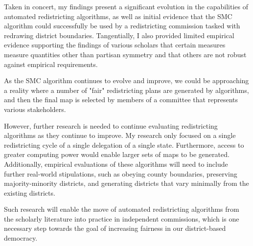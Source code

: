 Taken in concert, my findings present a significant evolution in the capabilities of automated redistricting algorithms, as well as initial evidence that the SMC algorithm could successfully be used by a redistricting commission tasked with redrawing district boundaries. Tangentially, I also provided limited empirical evidence supporting the findings of various scholars that certain measures measure quantities other than partisan symmetry and that others are not robust against empirical requirements. 

As the SMC algorithm continues to evolve and improve, we could be approaching a reality where a number of "fair" redistricting plans are generated by algorithms, and then the final map is selected by members of a committee that represents various stakeholders.

However, further research is needed to continue evaluating redistricting algorithms as they continue to improve. My research only focused on a single redistricting cycle of a single delegation of a single state. Furthermore, access to greater computing power would enable larger sets of maps to be generated. Additionally, empirical evaluations of these algorithms will need to include further real-world stipulations, such as obeying county boundaries, preserving majority-minority districts, and generating districts that vary minimally from the existing districts. 

Such research will enable the move of automated redistricting algorithms from the scholarly literature into practice in independent commissions, which is one necessary step towards the goal of increasing fairness in our district-based democracy. 